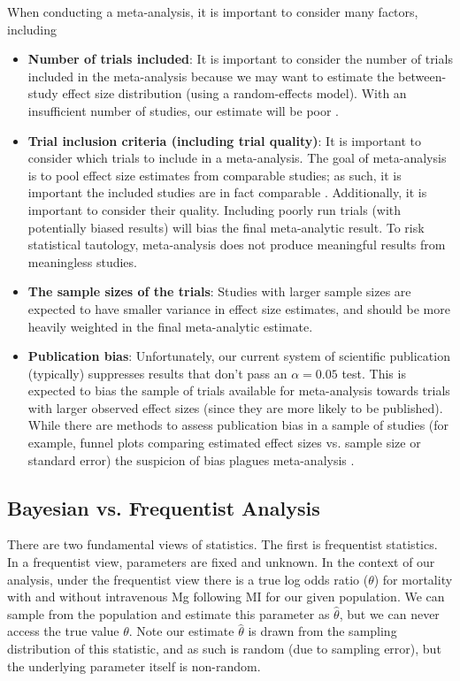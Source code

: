 \documentclass[fleqn,10pt]{SelfArx} %
\begin{document}
When conducting a meta-analysis, it is important to consider many factors, including
\begin{itemize}
\item \textbf{Number of trials included}: It is important to consider the number of trials included in the meta-analysis because we may want to estimate the between-study effect size distribution (using a random-effects model). With an insufficient number of studies, our estimate will be poor \cite{Hedges}.
\item \textbf{Trial inclusion criteria (including trial quality)}: It is important to consider which trials to include in a meta-analysis. The goal of meta-analysis is to pool effect size estimates from comparable studies; as such, it is important the included studies are in fact comparable \cite{Hedges}. Additionally, it is important to consider their quality. Including poorly run trials (with potentially biased results) will bias the final meta-analytic result. To risk statistical tautology, meta-analysis does not produce meaningful results from meaningless studies.
\item \textbf{The sample sizes of the trials}: Studies with larger sample sizes are expected to have smaller variance in effect size estimates, and should be more heavily weighted in the final meta-analytic estimate.
\item \textbf{Publication bias}: Unfortunately, our current system of scientific publication (typically) suppresses results that don't pass an $\alpha = 0.05$ test. This is expected to bias the sample of trials available for meta-analysis towards trials with larger observed effect sizes (since they are more likely to be published)\cite{Hedges}. While there are methods to assess publication bias in a sample of studies (for example, funnel plots comparing estimated effect sizes vs. sample size or standard error) the suspicion of bias plagues meta-analysis \cite{Original}. 
\end{itemize}

\subsection*{Bayesian vs. Frequentist Analysis}

There are two fundamental views of statistics. The first is frequentist statistics. In a frequentist view, parameters are fixed and unknown. In the context of our analysis, under the frequentist view there is a true log odds ratio ($\theta$) for mortality with and without intravenous Mg following MI for our given population. We can sample from the population and estimate this parameter as $\hat{\theta}$, but we can never access the true value $\theta$. Note our estimate $\hat{\theta}$ is drawn from the sampling distribution of this statistic, and as such is random (due to sampling error), but the underlying parameter itself is non-random.
\end{document}
